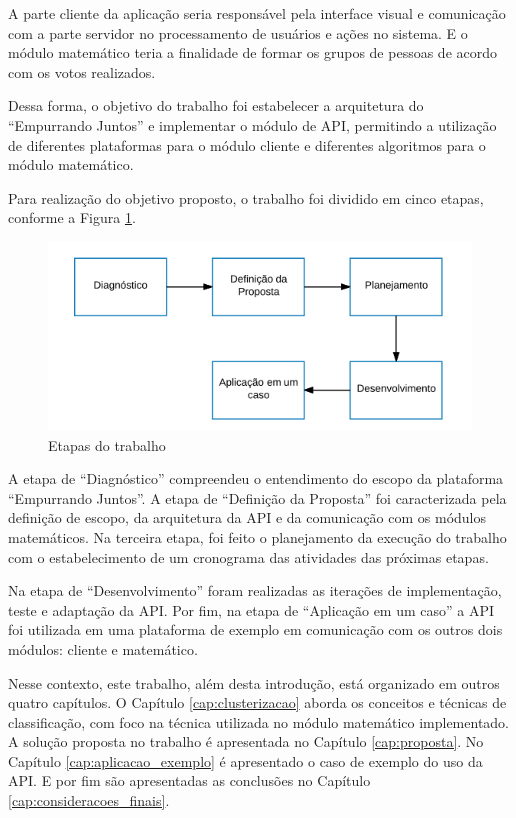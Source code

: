 A parte cliente da aplicação seria responsável pela interface visual e comunicação com a parte servidor no processamento
de usuários e ações no sistema. E o módulo matemático teria a finalidade de formar os grupos de pessoas de acordo com os votos realizados.

Dessa forma, o objetivo do trabalho foi estabelecer a arquitetura do ``Empurrando Juntos'' e implementar
o módulo de API, permitindo a utilização de diferentes plataformas para o módulo cliente e diferentes algoritmos para o módulo matemático.

Para realização do objetivo proposto, o trabalho foi dividido em cinco etapas, conforme a Figura \ref{fig:etapas_trabalho}. 

\begin{figure}[h!]
\centering
\includegraphics[scale=0.6]{figuras/etapas.png}
\caption{Etapas do trabalho}
\label{fig:etapas_trabalho}
\end{figure}

A etapa de ``Diagnóstico'' compreendeu o entendimento do escopo da plataforma ``Empurrando Juntos''. 
A etapa de ``Definição da Proposta'' foi caracterizada pela definição de escopo, 
da arquitetura da API e da comunicação com os módulos matemáticos. Na terceira etapa, 
foi feito o planejamento da execução do trabalho com o estabelecimento
de um cronograma das atividades das próximas etapas. 

Na etapa de ``Desenvolvimento'' foram realizadas as iterações de implementação, teste e adaptação da API. 
Por fim, na etapa de ``Aplicação em um caso'' a API foi utilizada em uma plataforma de exemplo em comunicação com os outros dois módulos: cliente e matemático.

Nesse contexto, este trabalho, além desta introdução, está organizado em outros quatro capítulos. 
O Capítulo \ref{cap:clusterizacao} aborda os conceitos e técnicas de 
classificação, com foco na técnica utilizada no módulo matemático implementado. 
A solução proposta no trabalho é apresentada no Capítulo \ref{cap:proposta}. No Capítulo \ref{cap:aplicacao_exemplo} é
apresentado o caso de exemplo do uso da API. E por fim são apresentadas as conclusões no Capítulo \ref{cap:consideracoes_finais}.
